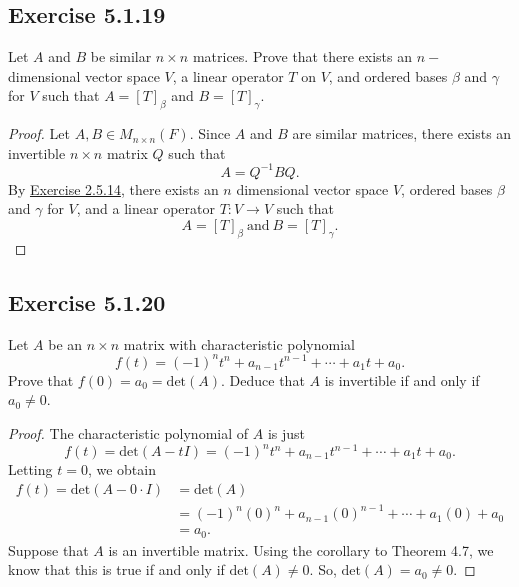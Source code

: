 \subsection*{Exercise 5.1.19} Let \( A  \) and \( B  \) be similar \( n \times n  \) matrices. Prove that there exists an \( n- \)dimensional vector space \( V  \), a linear operator \( T  \) on \( V  \), and ordered bases \( \beta  \) and \( \gamma \) for \( V  \) such that \( A = [T]_{\beta}  \) and \( B = [T]_{\gamma} \). %
\begin{proof}
Let \( A,B \in {M}_{n \times n}(F) \). Since \( A  \) and \( B  \) are similar matrices, there exists an invertible \( n \times n  \) matrix \( Q  \) such that
\[  A = Q^{-1} B Q. \]
By {\hyperref[Exercise 2.5.14]{Exercise 2.5.14}}, there exists an \( n  \) dimensional vector space \( V  \), ordered bases \( \beta \) and \( \gamma \) for \( V  \), and a linear operator \( T: V \to V  \) such that  
\[  A = [T]_{\beta} \ \text{and} \ B = [T]_{\gamma}. \]
\end{proof}

\subsection*{Exercise 5.1.20} Let \( A  \) be an \( n \times n  \) matrix with characteristic polynomial 
\[  f(t) = (-1)^{n} t^{n} + {a}_{n-1} t^{n-1} + \cdots + {a}_{1} t + {a}_{0}. \]
Prove that \( f(0) = {a}_{0} = \text{det}(A) \). Deduce that \( A  \) is invertible if and only if \( {a}_{0} \neq  0 \). 
\begin{proof}
The characteristic polynomial of \( A  \) is just
\[  f(t) = \text{det}(A - t I) = (-1)^{n} t^{n} + {a}_{n-1} t^{n-1} + \cdots + {a}_{1} t + {a}_{0}.  \]
Letting \( t = 0  \), we obtain
\begin{align*}
    f(t) = \text{det}(A - 0 \cdot I ) 
         &= \text{det}(A) \\
         &=  (-1)^{n} (0)^{n} + {a}_{n-1}(0)^{n-1} + \cdots + {a}_{1} (0) + {a}_{0} \\
         &= {a}_{0}.
\end{align*}
Suppose that \( A  \) is an invertible matrix. Using the corollary to Theorem 4.7, we know that this is true if and only if \( \text{det}(A) \neq  0 \). So, \( \text{det}(A) = {a}_{0} \neq 0  \).
\end{proof}

